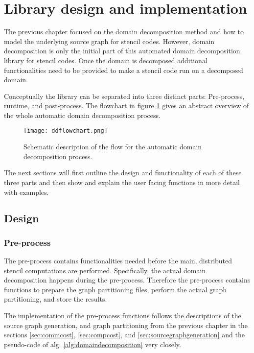 \section{Library design and implementation}
The previous chapter focused on the domain decomposition method and how to model the underlying source graph for stencil codes.
However, domain decomposition is only the initial part of this automated domain decomposition library for stencil codes.
Once the domain is decomposed additional functionalities need to be provided to make a stencil code run on a decomposed domain.

Conceptually the library can be separated into three distinct parts:
Pre-process, runtime, and post-process.
The flowchart in figure \ref{fig:library_flowchart} gives an abstract overview of the whole automatic domain decomposition process.

\begin{figure}
\centering
\texttt{[image: ddflowchart.png]}
\caption{Schematic description of the flow for the automatic domain decomposition process.}
\label{fig:library_flowchart}
\end{figure}

The next sections will first outline the design and functionality of each of these three parts and then show and explain the user facing functions in more detail with examples.

\subsection{Design}
\subsubsection{Pre-process}
The pre-process contains functionalities needed before the main, distributed stencil computations are performed.
Specifically, the actual domain decomposition happens during the pre-process.
Therefore the pre-process contains functions to prepare the graph partitioning files, perform the actual graph partitioning, and store the results.

The implementation of the pre-process functions follows the descriptions of the source graph generation, and graph partitioning from the previous chapter in the sections \ref{sec:commcost}, \ref{sec:compcost}, and \ref{sec:sourcegraphgeneration} and the pseudo-code of alg. \ref{alg:domaindecomposition} very closely.

